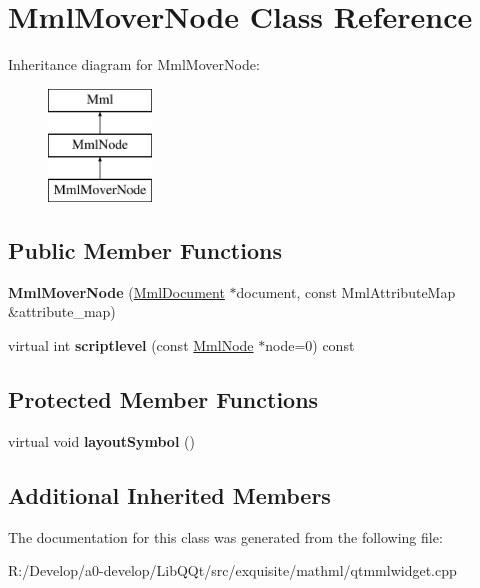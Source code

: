 \hypertarget{class_mml_mover_node}{}\section{Mml\+Mover\+Node Class Reference}
\label{class_mml_mover_node}
Inheritance diagram for Mml\+Mover\+Node\+:\begin{figure}[H]
\begin{center}
\leavevmode
\includegraphics[height=3.000000cm]{class_mml_mover_node}
\end{center}
\end{figure}
\subsection*{Public Member Functions}
\begin{DoxyCompactItemize}
\item 
\mbox{\label{class_mml_mover_node_a13e541a191a26fd2f22c1628d600e6d5}} 
{\bfseries Mml\+Mover\+Node} (\mbox{\hyperlink{class_mml_document}{Mml\+Document}} $\ast$document, const Mml\+Attribute\+Map \&attribute\+\_\+map)
\item 
\mbox{\label{class_mml_mover_node_a425edd911062f5c3d10d789c3e5eb278}} 
virtual int {\bfseries scriptlevel} (const \mbox{\hyperlink{class_mml_node}{Mml\+Node}} $\ast$node=0) const
\end{DoxyCompactItemize}
\subsection*{Protected Member Functions}
\begin{DoxyCompactItemize}
\item 
\mbox{\label{class_mml_mover_node_ae3aa2826e1b16929fc8b57731434ffb2}} 
virtual void {\bfseries layout\+Symbol} ()
\end{DoxyCompactItemize}
\subsection*{Additional Inherited Members}


The documentation for this class was generated from the following file\+:\begin{DoxyCompactItemize}
\item 
R\+:/\+Develop/a0-\/develop/\+Lib\+Q\+Qt/src/exquisite/mathml/qtmmlwidget.\+cpp\end{DoxyCompactItemize}
